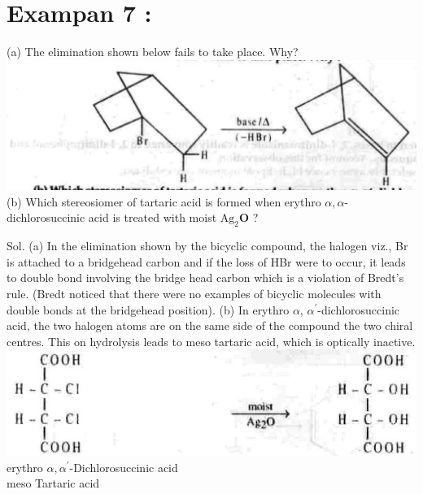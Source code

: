 \documentclass[10pt]{article}
\begin{document}
\section*{Exampan 7 :}
(a) The elimination shown below fails to take place. Why?\\
\includegraphics[max width=\textwidth, center]{2025_01_28_8470952b98110cec3aabg-116(1)}\\
(b) Which stereosiomer of tartaric acid is formed when erythro $\alpha, \alpha$-dichlorosuccinic acid is treated with moist $\mathrm{Ag}_{2} \mathbf{O}$ ?

Sol. (a) In the elimination shown by the bicyclic compound, the halogen viz., Br is attached to a bridgehead carbon and if the loss of HBr were to occur, it leads to double bond involving the bridge head carbon which is a violation of Bredt's rule. (Bredt noticed that there were no examples of bicyclic molecules with double bonds at the bridgehead position). (b) In erythro $\alpha$, $\alpha^{\prime}$-dichlorosuccinic acid, the two halogen atoms are on the same side of the compound the two chiral centres. This on hydrolysis leads to meso tartaric acid, which is optically inactive.\\
\includegraphics[max width=\textwidth, center]{2025_01_28_8470952b98110cec3aabg-117(1)}\\
erythro $\alpha, \alpha^{\prime}$-Dichlorosuccinic acid\\
meso Tartaric acid
\end{document}
